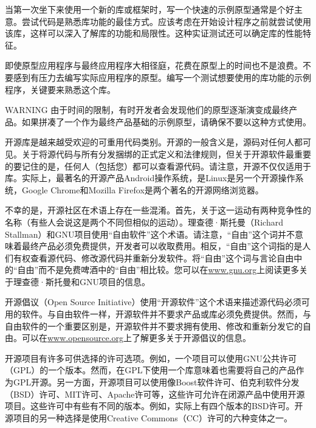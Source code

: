 
当第一次坐下来使用一个新的库或框架时，写一个快速的示例原型通常是个好主意。尝试代码是熟悉库功能的最佳方式。应该考虑在开始设计程序之前就尝试使用该库，这样可以深入了解库的功能和局限性。这种实证测试还可以确定库的性能特征。

即使原型应用程序与最终应用程序大相径庭，花费在原型上的时间也不是浪费。不要感到有压力去编写实际应用程序的原型。编写一个测试想要使用的库功能的示例程序，关键要来熟悉这个库。

\begin{myWarning}{WARNING}
由于时间的限制，有时开发者会发现他们的原型逐渐演变成最终产品。如果拼凑了一个作为最终产品基础的示例原型，请确保不要以这种方式使用。
\end{myWarning}


开源库是越来越受欢迎的可重用代码类别。开源的一般含义是，源码对任何人都可见。关于将源代码与所有分发捆绑的正式定义和法律规则，但关于开源软件最重要的要记住的是，任何人（包括您）都可以查看源代码。请注意，开源不仅仅适用于库。实际上，最著名的开源产品Android操作系统，是Linux是另一个开源操作系统，Google Chrome和Mozilla Firefox是两个著名的开源网络浏览器。


不幸的是，开源社区在术语上存在一些混淆。首先，关于这一运动有两种竞争性的名称（有些人会说这是两个不同但相似的运动）。理查德·斯托曼（Richard Stallman）和GNU项目使用“自由软件”这个术语。请注意，“自由”这个词并不意味着最终产品必须免费提供，开发者可以收取费用。相反，“自由”这个词指的是人们有权查看源代码、修改源代码并重新分发软件。将“自由”这个词与言论自由中的“自由”而不是免费啤酒中的“自由”相比较。您可以在\url{www.gnu.org}上阅读更多关于理查德·斯托曼和GNU项目的信息。

开源倡议（Open Source Initiative）使用“开源软件”这个术语来描述源代码必须可用的软件。与自由软件一样，开源软件并不要求产品或库必须免费提供。然而，与自由软件的一个重要区别是，开源软件并不要求拥有使用、修改和重新分发它的自由。可以在\url{www.opensource.org}上了解更多关于开源倡议的信息。

开源项目有许多可供选择的许可选项。例如，一个项目可以使用GNU公共许可（GPL）的一个版本。然而，在GPL下使用一个库意味着也需要将自己的产品作为GPL开源。另一方面，开源项目可以使用像Boost软件许可、伯克利软件分发（BSD）许可、MIT许可、Apache许可等，这些许可允许在闭源产品中使用开源项目。这些许可中有些有不同的版本。例如，实际上有四个版本的BSD许可。开源项目的另一种选择是使用Creative Commons（CC）许可的六种变体之一。

